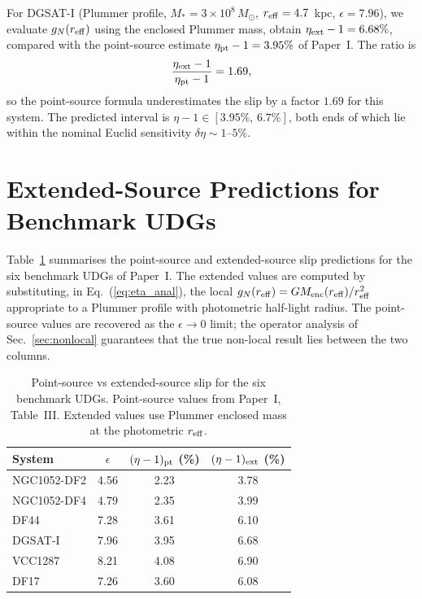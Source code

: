 \documentclass[aps,prd,twocolumn,superscriptaddress,nofootinbib]{revtex4-2}
\begin{document}
For DGSAT-I (Plummer profile,
$M_*=3\times10^8\,M_\odot$, $r_{\rm eff}=4.7$~kpc,
$\epsilon=7.96$), we evaluate $g_N(r_{\rm eff})$ using
the enclosed Plummer mass, obtain
$\eta_{\rm ext}-1=6.68\%$, compared with the point-source
estimate $\eta_{\rm pt}-1=3.95\%$ of Paper~I.
The ratio is
\begin{equation}
\frac{\eta_{\rm ext}-1}{\eta_{\rm pt}-1} = 1.69,
\end{equation}
so the point-source formula underestimates the slip
by a factor $1.69$ for this system.
The predicted interval is
$\eta-1\in[3.95\%,\,6.7\%]$, both ends of which lie
within the nominal Euclid sensitivity
$\delta\eta\sim1$--$5\%$.

\section{Extended-Source Predictions for Benchmark UDGs}
\label{sec:udg}

Table~\ref{tab:udg_ext} summarises the point-source and
extended-source slip predictions for the six benchmark
UDGs of Paper~I. The extended values are computed by
substituting, in Eq.~(\ref{eq:eta_anal}), the local
$g_N(r_{\rm eff}) = G M_{\rm enc}(r_{\rm eff})/r_{\rm eff}^2$
appropriate to a Plummer profile with photometric
half-light radius. The point-source values are recovered
as the $\epsilon \to 0$ limit; the operator
analysis of Sec.~\ref{sec:nonlocal} guarantees that the
true non-local result lies between the two columns.

\begin{table}[h]
\caption{Point-source vs extended-source slip for the six
benchmark UDGs. Point-source values from Paper~I,
Table~III. Extended values use Plummer enclosed mass at
the photometric $r_{\rm eff}$.}
\label{tab:udg_ext}
\begin{ruledtabular}
\begin{tabular}{lccc}
System & $\epsilon$ & $(\eta-1)_{\rm pt}$ (\%)
                    & $(\eta-1)_{\rm ext}$ (\%) \\
\hline
NGC1052-DF2 & 4.56 & 2.23 & 3.78 \\
NGC1052-DF4 & 4.79 & 2.35 & 3.99 \\
DF44        & 7.28 & 3.61 & 6.10 \\
DGSAT-I     & 7.96 & 3.95 & 6.68 \\
VCC1287     & 8.21 & 4.08 & 6.90 \\
DF17        & 7.26 & 3.60 & 6.08 \\
\end{tabular}
\end{ruledtabular}
\end{table}
\end{document}
